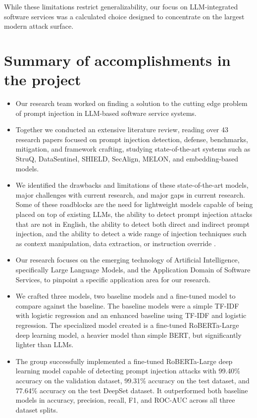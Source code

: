 \documentclass[12pt, letterpaper]{article}   %
\begin{document}
While these limitations restrict generalizability, our focus on LLM-integrated software services was a calculated choice designed to concentrate on the largest modern attack surface.


\section{Summary of accomplishments in the project}
\begin{itemize}
    \item Our research team worked on finding a solution to the cutting edge problem of prompt injection in LLM-based software service systems.
    \item Together we conducted an extensive literature review, reading over 43 research papers focused on prompt injection detection, defense, benchmarks, mitigation, and framework crafting, studying state-of-the-art systems such as StruQ, DataSentinel, SHIELD, SecAlign, MELON, and embedding-based models.
    \item We identified the drawbacks and limitations of these state-of-the-art models, major challenges with current research, and major gaps in current research. Some of these roadblocks are the need for lightweight models capable of being placed on top of existing LLMs, the ability to detect prompt injection attacks that are not in English, the ability to detect both direct and indirect prompt injection, and the ability to detect a wide range of injection techniques such as context manipulation, data extraction, or instruction override \cite{ref36}.
    \item Our research focuses on the emerging technology of Artificial Intelligence, specifically Large Language Models, and the Application Domain of Software Services, to pinpoint a specific application area for our research.
    \item We crafted three models, two baseline models and a fine-tuned model to compare against the baseline. The baseline models were a simple TF-IDF with logistic regression and an enhanced baseline using TF-IDF and logistic regression. The specialized model created is a fine-tuned RoBERTa-Large deep learning model, a heavier model than simple BERT, but significantly lighter than LLMs.
    \item The group successfully implemented a fine-tuned RoBERTa-Large deep learning model capable of detecting prompt injection attacks with 99.40\% accuracy on the validation dataset, 99.31\% accuracy on the test dataset, and 77.64\% accuracy on the test DeepSet dataset. It outperformed both baseline models in accuracy, precision, recall, F1, and ROC-AUC across all three dataset splits.

\end{itemize}
\end{document}

